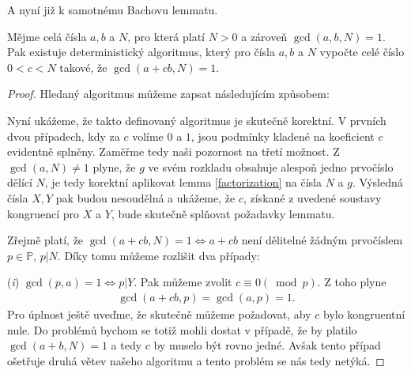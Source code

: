 A nyní již k samotnému Bachovu lemmatu.
\begin{lem} [Bach] \label{bach}
    Mějme celá čísla $ a, b $ a $ N $, pro která platí $ N > 0 $ a zároveň \newline
    $ \gcd(a,b,N) = 1 $. Pak existuje deterministický algoritmus, který pro
    čísla $ a, b $ a $ N $ vypočte celé číslo $ 0 < c < N $ takové, že
    $ \gcd(a + cb,N) = 1 $.
\end{lem}
\begin{proof}
Hledaný algoritmus můžeme zapsat následujícím způsobem:
    \begin{algorithm} \label{Bach_Algo}
    \end{algorithm}
Nyní ukážeme, že takto definovaný algoritmus je skutečně korektní. V prvních
dvou případech, kdy za $ c $ volíme $ 0 $ a $ 1 $, jsou podmínky
kladené na koeficient $ c $ evidentně splněny. Zaměřme tedy naši pozornost na třetí
možnost. Z $ \gcd(a,N) \neq 1 $ plyne, že $ g $ ve svém rozkladu obsahuje
alespoň jedno prvočíslo dělící $ N $, je tedy korektní aplikovat lemma
\ref{factorization} na čísla $ N $ a $ g $. Výsledná čísla $ X, Y $ pak budou
nesoudělná a ukážeme, že $ c $, získané z uvedené soustavy kongruencí pro
$ X $ a $ Y $, bude skutečně splňovat požadavky lemmatu.

Zřejmě platí, že $ \gcd(a+cb, N) = 1 \Leftrightarrow a + cb $ není dělitelné žádným
prvočíslem $ p \in \mathbb{P}$, $p \vert N $. Díky tomu můžeme rozlišit dva
případy:

(\textit{i}) $ \gcd(p,a) = 1 \Leftrightarrow p \vert Y $.
Pak můžeme zvolit $ c \equiv 0 (\bmod p) $. Z toho plyne
\begin{align*}
    \gcd(a + cb,p) = \gcd(a, p) = 1.
\end{align*}
Pro úplnost ještě uveďme, že skutečně můžeme požadovat, aby $ c $ bylo kongruentní
nule. Do problémů bychom se totiž mohli dostat v případě, že by platilo
$ \gcd(a + b, N) = 1 $ a tedy $ c $ by muselo být rovno jedné. Avšak tento případ
ošetřuje druhá větev našeho algoritmu a tento problém se nás tedy netýká.


\end{proof}
